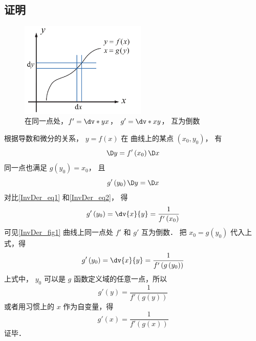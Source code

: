 \subsection{证明}
\begin{figure}[ht]
\centering
\includegraphics[width=6cm]{./figures/InvDer.pdf}
\caption{在同一点处，$f'=\dv*{y}{x}$， $g'=\dv*{x}{y}$， 互为倒数}\label{InvDer_fig1}
\end{figure}
根据导数和微分的关系， $y = f\left( x \right)$ 在 曲线上的某点 $\left( {{x_0},{y_0}} \right)$， 有
 \begin{equation}\label{InvDer_eq1}
\D y = f'\left( {{x_0}} \right)\D x
\end{equation}
同一点也满足 $g\left( {{y_0}} \right) = {x_0}$， 且
 \begin{equation}\label{InvDer_eq2}
g'\left( {{y_0}} \right)\D y = \D x
\end{equation}
对比\autoref{InvDer_eq1} 和\autoref{InvDer_eq2}， 得
\begin{equation}
g'\left( {{y_0}} \right) = \dv{x}{y} = \frac{1}{{f'\left( {{x_0}} \right)}}
\end{equation}
可见\autoref{InvDer_fig1} 曲线上同一点处 $f'$ 和 $g'$ 互为倒数． 把 ${x_0} = g\left( {{y_0}} \right)$ 代入上式，得
\begin{equation}
g'\left( {{y_0}} \right) = \dv{x}{y} = \frac{1}{{f'\left( {g\left( {{y_0}} \right)} \right)}}
\end{equation} 
上式中， ${y_0}$ 可以是 $g$ 函数定义域的任意一点，所以
\begin{equation}
g'\left( y \right) = \frac{1}{{f'\left( {g\left( y \right)} \right)}}
\end{equation} 
或者用习惯上的 $x$ 作为自变量，得
\begin{equation}
g'\left( x \right) = \frac{1}{{f'\left( {g\left( x \right)} \right)}}
\end{equation}
证毕．
















